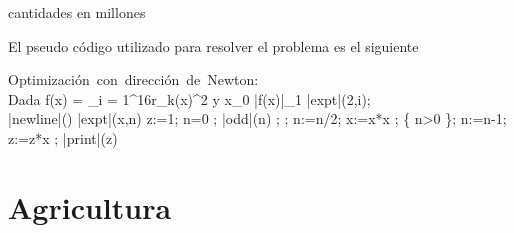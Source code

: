 \documentclass[11pt]{article}
\begin{document}
\scriptsize{cantidades en millones}

El pseudo código utilizado para resolver el problema es el siguiente

\begin{program}
\mbox{Optimización con dirección de Newton:}
\BEGIN \\ %
Dada f(x) = \displaystyle\sum_{i = 1}^{16}r_k(x)^2 \quad \epsilon \quad y \quad x_0
  \WHILE |\nabla f(x)|_1\geq \epsilon \DO
     |expt|(2,i); \\ |newline|() \OD %
\WHERE
\PROC |expt|(x,n) \BODY
          z:=1;
          \DO \IF n=0 \THEN \EXIT \FI;
             \DO \IF |odd|(n) \THEN \EXIT \FI;
;
                n:=n/2; x:=x*x \OD;
             \{ n>0 \};
             n:=n-1; z:=z*x \OD;
          |print|(z) \ENDPROC
\END

\end{program}

\section{Agricultura}
\end{document}

